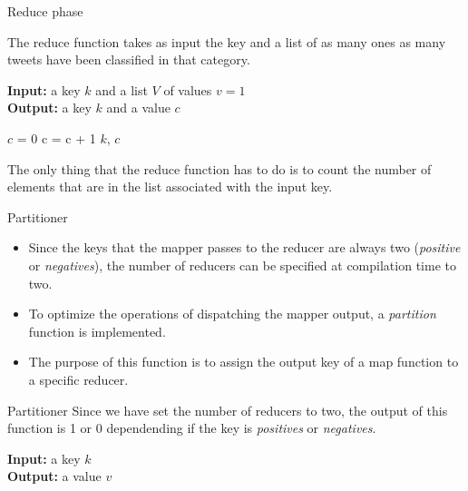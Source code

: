 \documentclass{beamer}
\begin{document}
\begin{frame}{Reduce phase}

The reduce function takes as input the key and a list of as many ones as many tweets have been classified in that category.

\begin{algorithm}[H]
\caption{Reduce function}
\textbf{Input:} a key $k$ and a list $V$ of values $v = 1$ \\
\textbf{Output:} a key $k$ and a value $c$ \\
\begin{algorithmic}
    \State $c$ = 0
        \State c = c + 1
    \EndFor
    \State \Return $k$, $c$
\end{algorithmic}
\end{algorithm}

The only thing that the reduce function has to do is to count the number of elements that are in the list associated with the input key.

\end{frame}


\begin{frame}{Partitioner}

\begin{itemize}
\item
Since the keys that the mapper passes to the reducer are always two (\textit{positive} or \textit{negatives}), the number of reducers can be specified at compilation time to two.
\item
To optimize the operations of dispatching the mapper output, a \textit{partition} function is implemented.
\item
The purpose of this function is to assign the output key of a map function to a specific reducer.
\end{itemize}

\end{frame}


\begin{frame}{Partitioner}
Since we have set the number of reducers to two, the output of this function is 1 or 0 dependending if the key is \textit{positives} or \textit{negatives}.

\begin{algorithm}[H]
\caption{Partion function}
\textbf{Input:} a key $k$ \\
\textbf{Output:} a value $v$ \\
\begin{algorithmic}
        \State {}
        \State {}
    \Else
        \State {} 
    \EndIf
\end{algorithmic}
\end{algorithm}

\end{frame}
\end{document}
